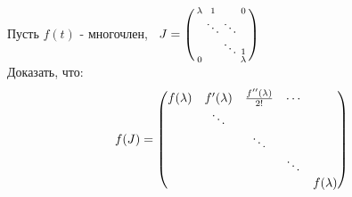     \begin{exercise}
        Пусть $f(t)$ - многочлен, \ $J = \left(\begin{smallmatrix}
            \lambda & 1 & \null & 0\\
            \null & \ddots & \ddots\\
            \null & \null & \ddots & 1 \\
            0 & \null & \null & \lambda
        \end{smallmatrix}
        \right)$\\
        Доказать, что:
        $$f(J) = \begin{pmatrix}
            f(\lambda) & f'(\lambda) & \frac{f''(\lambda)}{2!} & \cdots\\
            \null & \ddots \\
            \null & \null & \ddots\\
            \null & \null & \null & \ddots\\
            \null & \null & \null & \null & f(\lambda)
        \end{pmatrix}$$  
    \end{exercise}

